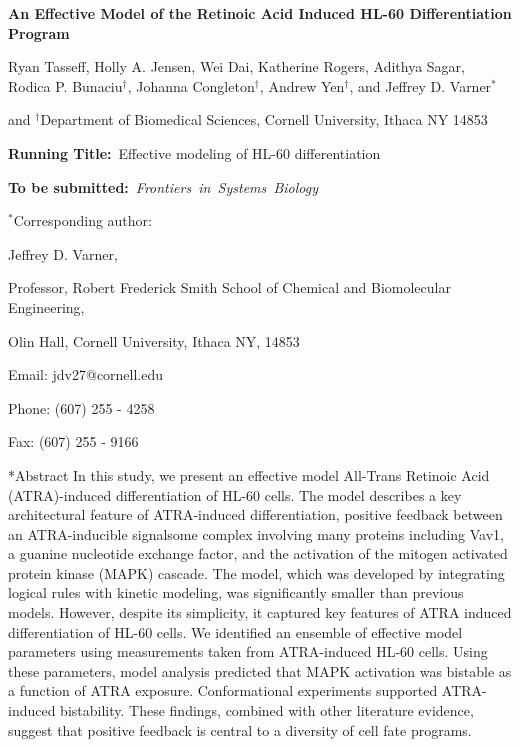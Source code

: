 \documentclass[12pt]{article}
\makeatletter
\renewcommand\section{\@startsection
	{subsection}{2}{0mm}
	{-0.2in}
	{0.05\baselineskip}
	{\normalfont\large\bfseries}}
\makeatother
\begin{document}
\begin{titlepage}
{\par\centering\textbf{\Large {An Effective Model of the Retinoic Acid Induced HL-60 Differentiation Program}}}
\vspace{0.05in}
{\par \centering \large{Ryan Tasseff, Holly A. Jensen, Wei Dai, Katherine Rogers, Adithya Sagar, Rodica P. Bunaciu$^{\dag}$, Johanna Congleton$^{\dag}$, Andrew Yen$^{\dag}$, and Jeffrey D. Varner$^{*}$}}
\vspace{0.10in}
{\par {} and {$^{\dag}$Department of Biomedical Sciences, {Cornell University, Ithaca NY 14853}}}
\vspace{0.1in}
{\par \centering \textbf{Running Title:}~Effective modeling of HL-60 differentiation}
\vspace{0.1in}
{\par \centering \textbf{To be submitted:}~\emph{Frontiers~in~Systems~Biology}}
\vspace{0.5in}
{\par \centering $^{*}$Corresponding author:}
{\par \centering Jeffrey D. Varner,}
{\par \centering Professor, Robert Frederick Smith School of Chemical and Biomolecular Engineering,}
{\par {} Olin Hall, Cornell University, Ithaca NY, 14853}
{\par \centering Email: jdv27@cornell.edu}
{\par \centering Phone: (607) 255 - 4258}
{\par \centering Fax: (607) 255 - 9166}
\end{titlepage}
\date{}
\thispagestyle{empty}
\pagebreak

\section*{Abstract}
In this study, we present an effective model All-Trans Retinoic Acid (ATRA)-induced differentiation of HL-60 cells.
The model describes a key architectural feature of ATRA-induced differentiation,
positive feedback between an ATRA-inducible signalsome complex involving many proteins including Vav1, a guanine nucleotide exchange factor,
and the activation of the mitogen activated protein kinase (MAPK) cascade.
The model, which was developed by integrating logical rules with kinetic modeling, was significantly smaller than previous models.
However, despite its simplicity, it captured key features of ATRA induced differentiation of HL-60 cells.
We identified an ensemble of effective model parameters using measurements taken from ATRA-induced HL-60 cells.
Using these parameters, model analysis predicted that MAPK activation was bistable as a function of ATRA exposure.
Conformational experiments supported ATRA-induced bistability.
These findings, combined with other literature evidence, suggest that positive feedback is central to a diversity of cell fate programs.
\end{document}
